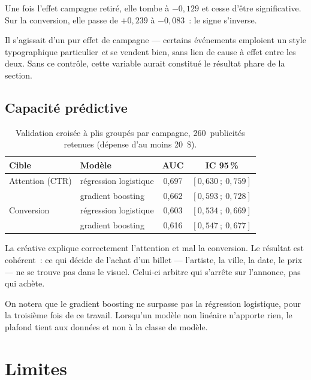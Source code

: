 \documentclass[11pt,a4paper]{article}
\begin{document}
Une fois l'effet campagne retiré, elle tombe à $-0{,}129$ et cesse d'être
significative. Sur la conversion, elle passe de $+0{,}239$ à $-0{,}083$~: le
signe s'inverse.

Il s'agissait d'un pur effet de campagne --- certains événements emploient un
style typographique particulier \emph{et} se vendent bien, sans lien de cause à
effet entre les deux. Sans ce contrôle, cette variable aurait constitué le
résultat phare de la section.

\subsection{Capacité prédictive}

\begin{table}[h]
\centering
\small
\begin{tabular}{@{}llcc@{}}
\toprule
\textbf{Cible} & \textbf{Modèle} & \textbf{AUC} & \textbf{IC 95\,\%} \\
\midrule
Attention (CTR) & régression logistique   & 0{,}697 & $[0{,}630~;~0{,}759]$ \\
                & gradient boosting        & 0{,}662 & $[0{,}593~;~0{,}728]$ \\
\addlinespace
Conversion      & régression logistique   & 0{,}603 & $[0{,}534~;~0{,}669]$ \\
                & gradient boosting        & 0{,}616 & $[0{,}547~;~0{,}677]$ \\
\bottomrule
\end{tabular}
\caption{Validation croisée à plis groupés par campagne, 260~publicités
retenues (dépense d'au moins 20~\$).}
\end{table}

La créative explique correctement l'attention et mal la conversion. Le résultat
est cohérent~: ce qui décide de l'achat d'un billet --- l'artiste, la ville, la
date, le prix --- ne se trouve pas dans le visuel. Celui-ci arbitre qui
s'arrête sur l'annonce, pas qui achète.

On notera que le gradient boosting ne surpasse pas la régression logistique,
pour la troisième fois de ce travail. Lorsqu'un modèle non linéaire n'apporte
rien, le plafond tient aux données et non à la classe de modèle.

\section{Limites}
\end{document}
